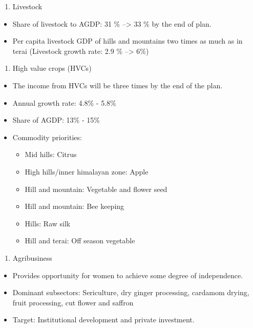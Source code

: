 \documentclass[
  openany]{book}
\providecommand{\tightlist}{%
  \setlength{\itemsep}{0pt}\setlength{\parskip}{0pt}}
\begin{document}
\begin{enumerate}
\def\labelenumi{\arabic{enumi}.}
\tightlist
\item
  Livestock
\end{enumerate}

\begin{itemize}
\tightlist
\item
  Share of livestock to AGDP: 31 \% --\textgreater{} 33 \% by the end of plan.
\item
  Per capita livestock GDP of hills and mountains two times as much as in terai (Livestock growth rate: 2.9 \% --\textgreater{} 6\%)
\end{itemize}

\begin{enumerate}
\def\labelenumi{\arabic{enumi}.}
\setcounter{enumi}{1}
\tightlist
\item
  High value crops (HVCs)
\end{enumerate}

\begin{itemize}
\tightlist
\item
  The income from HVCs will be three times by the end of the plan.
\item
  Annual growth rate: 4.8\% - 5.8\%
\item
  Share of AGDP: 13\% - 15\%
\item
  Commodity priorities:

  \begin{itemize}
  \tightlist
  \item
    Mid hills: Citrus
  \item
    High hills/inner himalayan zone: Apple
  \item
    Hill and mountain: Vegetable and flower seed
  \item
    Hill and mountain: Bee keeping
  \item
    Hills: Raw silk
  \item
    Hill and terai: Off season vegetable
  \end{itemize}
\end{itemize}

\begin{enumerate}
\def\labelenumi{\arabic{enumi}.}
\setcounter{enumi}{2}
\tightlist
\item
  Agribusiness
\end{enumerate}

\begin{itemize}
\tightlist
\item
  Provides opportunity for women to achieve some degree of independence.
\item
  Dominant subsectors: Sericulture, dry ginger processing, cardamom drying, fruit processing, cut flower and saffron
\item
  Target: Institutional development and private investment.
\end{itemize}
\end{document}
